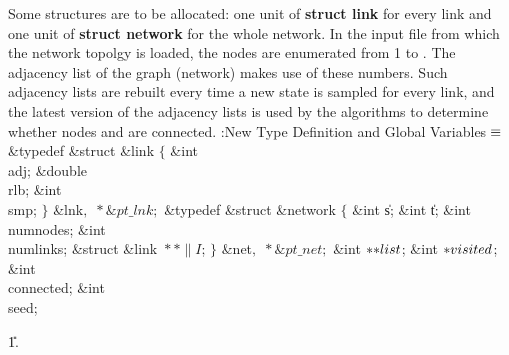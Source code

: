 Some structures are to be allocated: one unit of {\bf struct link} for every
link and one unit of {\bf struct network} for the whole network. In the input
file from which the network topolgy is loaded, the nodes are enumerated from 1
to . The adjacency list of the graph (network) makes use of
these
numbers. Such adjacency lists are rebuilt every time a new state is sampled for
every link, and the latest version of the adjacency lists is used by the
algorithms to determine whether nodes  and  are connected.
\Y\B\4:New Type Definition and Global Variables\X${}\equiv{}$\6
\&{typedef} \&{struct} \&{link} ${}\{{}$\1\6
\&{int} \\{adj};\6
\&{double} \\{rlb};\6
\&{int} \\{smp};\2\6
${}\}{}$ \&{lnk}${},{}$  ${}{*}\&{pt\_lnk};{}$\6
\&{typedef} \&{struct} \&{network} ${}\{{}$\1\6
\&{int} \|s;\6
\&{int} \|t;\6
\&{int} \\{numnodes};\6
\&{int} \\{numlinks};\6
\&{struct} \&{link} ${}{*}{*}\|I{}$;\2\6
${}\}{}$ \&{net}${},{}$  ${}{*}\&{pt\_net};{}$\6
\&{int} ${}{*}{*}\\{list}{}$;\6
\&{int} ${}{*}\\{visited}{}$;\6
\&{int} \\{connected};\6
\&{int} \\{seed};%
\par
\U1.\fi

